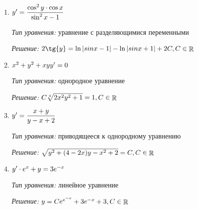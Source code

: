\begin{enumerate}                                                   
	\item 
		$ {y}' = \dfrac{\cos^{2}{y} \cdot \cos{x}}{\sin^2{x} - 1} $
		
		\textit{Тип уравнения:} уравнение с разделяющимися переменными
		
		\textit{Решение:} 
		$ 2\tg{y} = \ln{|sinx - 1|} - \ln{|sinx + 1|} + 2C, C \in \rational $ 

	\item 
		$ {x}^2 + {y}^2 + xyy' = 0 $
		
		\textit{Тип уравнения:} однородное уравнение
		
		\textit{Решение:}
		$ C\sqrt[4]{{2 x^2 y^2} + 1} = 1, C \in \mathop{\rm \mathbb{R}} $ 
		
	\newpage
		
	\item
		$ {y}' = \dfrac{x + y}{y - x + 2} $
		
		\textit{Тип уравнения:} приводящееся к однородному уравнению
		
		\textit{Решение:}
		$ \sqrt{y^2 + (4 - 2x) y - x^2 + 2} = C, C \in \mathop{\rm \mathbb{R}} $    
		               
	\item
		$ {y}' \cdot e^{x} + {y} = 3e^{-x} $
		
		\textit{Тип уравнения:} линейное уравнение
		
		\textit{Решение:}
		$ y = Ce^{e^{-x}} + 3e^{-x} + 3, C \in \mathop{\rm \mathbb{R}} $ 
		
\end{enumerate}
